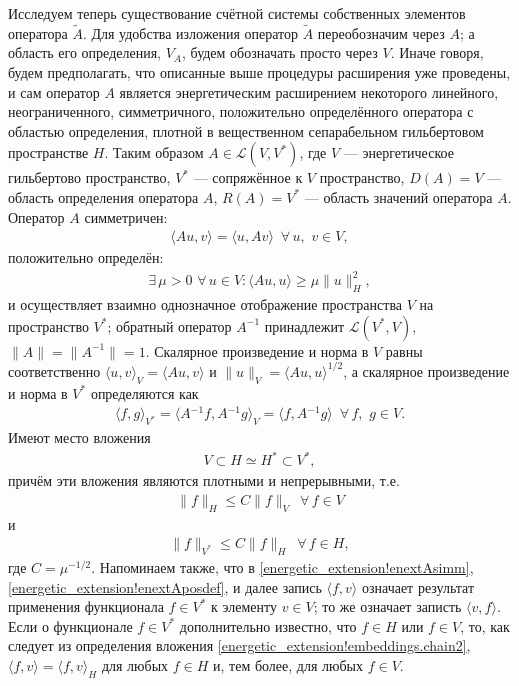 \documentclass{report}
\begin{document}
Исследуем теперь существование счётной системы собственных элементов оператора $\tilde{A}$. Для удобства изложения оператор $\tilde{A}$ переобозначим через $A$; а область его определения,
$V_A$, будем обозначать просто через $V$. Иначе говоря, будем предполагать, что описанные выше процедуры расширения уже проведены, и сам оператор $A$ является энергетическим расширением
некоторого линейного, неограниченного, симметричного, положительно определённого оператора с областью определения, плотной в вещественном сепарабельном гильбертовом пространстве $H$. Таким
образом $A\in\mathcal{L}(V,V^*)$, где $V$ --- энергетическое гильбертово пространство, $V^*$ --- сопряжённое к $V$ пространство, $D(A)=V$ --- область определения оператора $A$, $R(A)=V^*$
--- область значений оператора $A$. Оператор $A$ симметричен:
\begin{gather}\label{energetic_extension!enextAsimm}
\langle Au,v\rangle=\langle u,Av\rangle\,\,\,\forall\,u,\,\,v\in V,
\end{gather}
положительно определён:
\begin{gather}\label{energetic_extension!enextAposdef}
\exists\,\mu>0\,\,\forall\,u\in V:\langle Au,u\rangle\geqslant\mu\|u\|^2_H,
\end{gather}
и осуществляет взаимно однозначное отображение пространства $V$ на пространство $V^*$; обратный оператор $A^{-1}$ принадлежит $\mathcal{L}(V^*,V)$, $\|A\|=\|A^{-1}\|=1$. Скалярное
произведение и норма в $V$ равны соответственно $\langle u,v\rangle_V=\langle Au,v\rangle$ и $\|u\|_V=\langle Au,u\rangle^{1/2}$, а скалярное произведение и норма в $V^*$ определяются как
\begin{gather*}
\langle f,g\rangle_{V^*}=\langle A{}^{-1}f,{A}{}^{-1}g\rangle_V=\langle f,{A}{}^{-1}g\rangle\,\,\,\forall\,f,\,\,g\in V.
\end{gather*}
Имеют место вложения
\begin{gather} \label{energetic_extension!embeddings.chain2}
V\subset H\simeq H^*\subset V^*,
\end{gather}
причём эти вложения являются плотными и непрерывными, т.е.
\begin{gather*}
\|f\|_H\leqslant C\|f\|_V\,\,\,\forall\,f\in V
\end{gather*}
и
\begin{gather*}
\|f\|_{V^*}\leqslant C\|f\|_H\,\,\,\forall\,f\in H,
\end{gather*}
где $C=\mu^{-1/2}$. Напоминаем также, что в \eqref{energetic_extension!enextAsimm}, \eqref{energetic_extension!enextAposdef}, и далее запись $\langle f,v\rangle$ означает результат
применения функционала $f\in V^*$ к элементу $v\in V$; то же означает записть $\langle v,f\rangle$. Если о функционале $f\in V^*$ дополнительно известно, что $f\in H$ или $f\in V$,
то, как следует из определения вложения \eqref{energetic_extension!embeddings.chain2}, $\langle f,v\rangle=\langle f,v\rangle_H$ для любых $f\in H$ и, тем более, для любых $f\in V$.
\end{document}
